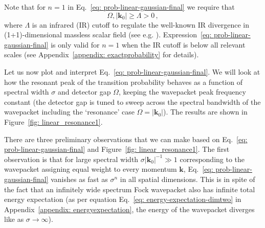 \documentclass[prd,twocolumn,superscriptaddress,nofootinbib,floatfix,amsmath,amssymb]{revtex4-2}
\newcommand{\bk}{{\bm{k}}}
\begin{document}
    Note that for $n=1$ in Eq.~\eqref{eq: prob-linear-gaussian-final} we require that
    \begin{equation}
        \Omega,|\bk_0| \geq \Lambda > 0\,,
        \label{eq: IR-cutoff}
    \end{equation}
    where $\Lambda$ is an infrared (IR) cutoff to regulate the well-known IR divergence in (1+1)-dimensional massless scalar field (see e.g. \cite{birrell1984quantum,pozas2015harvesting}). Expression~\eqref{eq: prob-linear-gaussian-final}  is only valid for $n=1$  when the IR cutoff is below all relevant scales (see Appendix~\ref{appendix: exactprobability} for details). 
    
    	
    Let us now plot and interpret Eq.~\eqref{eq: prob-linear-gaussian-final}. We will look at how the resonant peak of the transition probability behaves as a function of spectral width $\sigma$ and detector gap $\Omega$, keeping the wavepacket peak frequency constant (the detector gap is tuned to sweep across the spectral bandwidth of the wavepacket including the `resonance' case $\Omega=|\bk_0|$). The results are shown in Figure~\ref{fig: linear_resonance1}.
    
 
    	
    There are three preliminary observations that we can make based on Eq.~\eqref{eq: prob-linear-gaussian-final} and Figure~\ref{fig: linear_resonance1}. The first observation is that for large spectral width $\sigma|\bk_0|^{-1}\gg 1$ corresponding to the wavepacket assigning equal weight to every momentum $\bk$, Eq.~\eqref{eq: prob-linear-gaussian-final} vanishes as fast as $\sigma^n$ in all spatial dimensions. This is in spite of the fact that an infinitely wide spectrum Fock wavepacket also has infinite total energy expectation (as per equation Eq.~\eqref{eq: energy-expectation-dimtwo} in Appendix~\ref{appendix: energyexpectation}, the energy of the wavepacket diverges like as $\sigma\rightarrow\infty$). %
    
\end{document}
